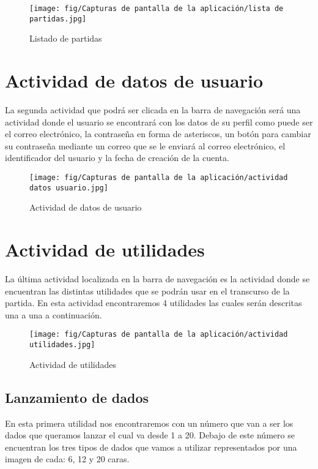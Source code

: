 \begin{figure}[H]
    \centering
    \texttt{[image: fig/Capturas de pantalla de la aplicación/lista de partidas.jpg]}
    \caption{Listado de partidas}
    \label{fig:listado de partidas}
\end{figure}

\section{Actividad de datos de usuario}

La segunda actividad que podrá ser clicada en la barra de navegación será una actividad donde el usuario se encontrará con los datos de su perfil como puede ser el correo electrónico, la contraseña en forma de asteriscos, un botón para cambiar su contraseña mediante un correo que se le enviará al correo electrónico, el identificador del usuario y la fecha de creación de la cuenta.

\begin{figure}[H]
    \centering
    \texttt{[image: fig/Capturas de pantalla de la aplicación/actividad datos usuario.jpg]}
    \caption{Actividad de datos de usuario}
    \label{fig:actividad datos usuario}
\end{figure}

\section{Actividad de utilidades}

La última actividad localizada en la barra de navegación es la actividad donde se encuentran las distintas utilidades que se podrán usar en el transcurso de la partida. En esta actividad encontraremos 4 utilidades las cuales serán descritas una a una a continuación.

\begin{figure}[H]
    \centering
    \texttt{[image: fig/Capturas de pantalla de la aplicación/actividad utilidades.jpg]}
    \caption{Actividad de utilidades}
    \label{fig:actividad utilidades}
\end{figure}

\subsection{Lanzamiento de dados}\label{cap:Actividad de utilidades}

En esta primera utilidad nos encontraremos con un número que van a ser los dados que queramos lanzar el cual va desde 1 a 20. Debajo de este número se encuentran los tres tipos de dados que vamos a utilizar representados por una imagen de cada: 6, 12 y 20 caras. 

